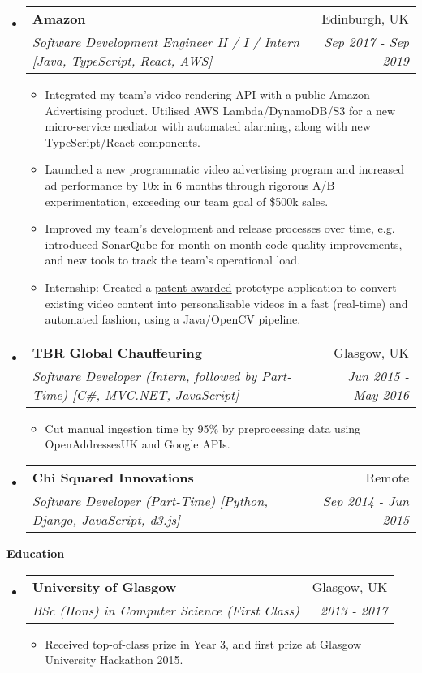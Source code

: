 \documentclass[letterpaper,11pt]{article}
\makeatletter
\newcommand{\resitem}[1]{\item #1 \vspace{-2pt}}
\newcommand{\resheading}[1]{{\large \colorbox{mygrey}{\begin{minipage}{\textwidth}{\textbf{#1 \vphantom{p\^{E}}}}\end{minipage}}}}
\newcommand{\ressubheading}[4]{
\begin{tabular*}{7.0in}{l@{\extracolsep{\fill}}r}
	\textbf{#1} & #2 \\
	\textit{#3} & \textit{#4} \\
\end{tabular*}\vspace{-6pt}}
\makeatother
\begin{document}
\begin{itemize}
		\item
		\ressubheading{Amazon}{Edinburgh, UK}{Software Development Engineer II / I / Intern [Java, TypeScript, React, AWS]}{Sep 2017 - Sep 2019}
		\begin{itemize}
			\resitem{Integrated my team's video rendering API with a public Amazon Advertising product. Utilised AWS Lambda/DynamoDB/S3 for a new micro-service mediator with automated alarming, along with new TypeScript/React components.}
			\resitem{Launched a new programmatic video advertising program and increased ad performance by 10x in 6 months through rigorous A/B experimentation, exceeding our team goal of \$500k sales.}
			\resitem{Improved my team's development and release processes over time, e.g. introduced SonarQube for month-on-month code quality improvements, and new tools to track the team's operational load.}
			\resitem{Internship: Created a \href{https://pdfpiw.uspto.gov/.piw?PageNum=0&docid=10297026&IDKey=E3B5AD2132FF&HomeUrl=\%2F\%2Fpatft.uspto.gov\%2Fnetahtml\%2FPTO\%2Fpatimg.htm}{patent-awarded} prototype application to convert existing video content into personalisable videos in a fast (real-time)
			and automated fashion, using a Java/OpenCV pipeline.}
		\end{itemize}

		\item
		\ressubheading{TBR Global Chauffeuring}{Glasgow, UK}{Software Developer (Intern, followed by Part-Time) [C\#, MVC.NET, JavaScript]}{Jun 2015 - May 2016}
		\begin{itemize}
			\resitem{Cut manual ingestion time by 95\% by preprocessing data using OpenAddressesUK and Google APIs.}
		\end{itemize}

		\item
		\ressubheading{Chi Squared Innovations}{Remote}{Software Developer (Part-Time) [Python, Django, JavaScript, d3.js]}{Sep 2014 - Jun 2015}

	\end{itemize}

	\resheading{Education}
	\begin{itemize}
		\item
		\ressubheading{University of Glasgow}{Glasgow, UK}{BSc (Hons) in Computer Science (First Class)}{2013 - 2017}
		\begin{itemize}
			\resitem{Received top-of-class prize in Year 3, and first prize at Glasgow University Hackathon 2015.}
		\end{itemize}
	\end{itemize}
\end{document}
